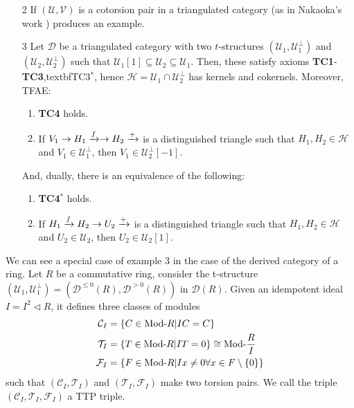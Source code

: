 \begin{examples}
  \begin{enumerate}
    \item[2] If $(\mathcal{U},\mathcal{V})$ is a cotorsion pair in a triangulated
    category (as in Nakaoka's work ) produces an example.
    \item[3] Let $\mathcal{D}$ be a triangulated category with two $t$-structures
    $(\mathcal{U}_1,\mathcal{U}_1^\perp)$ and $(\mathcal{U}_2,\mathcal{U}_2^\perp)$ such that
    $\mathcal{U}_1[1]\subseteq\mathcal{U}_2\subseteq\mathcal{U}_1$. Then, these satisfy
    axioms \textbf{TC1}-\textbf{TC3},textbf{TC3$^*$}, hence $\mathcal{H}=\mathcal{U}_1\cap\mathcal{U}_2^\perp$ has
    kernels and cokernels. Moreover, TFAE:
    \begin{enumerate}
      \item \textbf{TC4} holds.
      \item If $V_1\to H_1\xrightarrow{f}\to H_2\xrightarrow{+}$ is a distinguished triangle such
      that $H_1, H_2\in\mathcal{H}$ and $V_1\in\mathcal{U}_1^\perp$, then $V_1\in\mathcal{U}_2^\perp[-1]$.
    \end{enumerate}
    And, dually, there is an equivalence of the following:
    \begin{enumerate}
      \item \textbf{TC4$^*$} holds.
      \item\label{ax:eqa} If $H_1\xrightarrow{f}H_2\to U_2\xrightarrow{+}$ is a distinguished triangle such
      that $H_1,H_2\in\mathcal{H}$ and $U_2\in\mathcal{U}_2$, then $U_2\in\mathcal{U}_2[1]$.
    \end{enumerate}
  \end{enumerate}
\end{examples}

We can see a special case of example 3 in the case of the derived category of a ring.
Let $R$ be a commutative ring, consider the t-structure $(\mathcal{U}_1,\mathcal{U}_1^\perp)=(\mathcal{D}^{\leq 0}(R), \mathcal{D}^{>0}(R))$
in $\mathcal{D}(R)$. Given an idempotent ideal $I=I^2\lhd R$, it defines three classes of modules
\begin{align*}
  \mathcal{C}_I &= \{ C\in\mathrm{\textup{Mod-}}R | IC=C\}\\
  \mathcal{T}_I &= \{ T\in\mathrm{\textup{Mod-}}R | IT=0\} \cong \mathrm{\textup{Mod-}}\frac{R}{I}\\
  \mathcal{F}_I &= \{ F\in\mathrm{\textup{Mod-}}R | Ix \neq 0 \forall x\in F\setminus \{0\} \}
\end{align*}
such that $(\mathcal{C}_I, \mathcal{T}_I)$ and $(\mathcal{T}_I,\mathcal{F}_I)$ make two torsion pairs.
We call the triple $(\mathcal{C}_I,\mathcal{T}_I,\mathcal{F}_I)$ a TTP triple.

